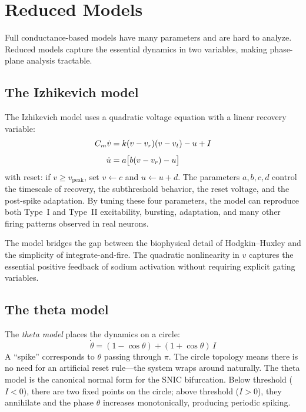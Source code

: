 \section{Reduced Models}
\label{sec:reduced-models}

Full conductance-based models have many parameters and are hard to analyze. Reduced models capture the essential dynamics in two variables, making phase-plane analysis tractable.

\subsection{The Izhikevich model}

The Izhikevich model uses a quadratic voltage equation with a linear recovery variable:
%
\begin{align}
  C_m\dot{v} &= k(v - v_r)(v - v_t) - u + I \label{eq:izh-v} \\[4pt]
  \dot{u} &= a\bigl[b(v - v_r) - u\bigr] \label{eq:izh-u}
\end{align}
%
with reset: if $v \geq v_{\text{peak}}$, set $v \leftarrow c$ and $u \leftarrow u + d$. The parameters $a, b, c, d$ control the timescale of recovery, the subthreshold behavior, the reset voltage, and the post-spike adaptation. By tuning these four parameters, the model can reproduce both Type~I and Type~II excitability, bursting, adaptation, and many other firing patterns observed in real neurons.

The model bridges the gap between the biophysical detail of Hodgkin--Huxley and the simplicity of integrate-and-fire. The quadratic nonlinearity in $v$ captures the essential positive feedback of sodium activation without requiring explicit gating variables.

\subsection{The theta model}

The \emph{theta model} places the dynamics on a circle:
%
\begin{equation}
  \dot{\theta} = (1 - \cos\theta) + (1 + \cos\theta)\,I
  \label{eq:theta}
\end{equation}
%
A ``spike'' corresponds to $\theta$ passing through $\pi$. The circle topology means there is no need for an artificial reset rule---the system wraps around naturally. The theta model is the canonical normal form for the SNIC bifurcation. Below threshold ($I < 0$), there are two fixed points on the circle; above threshold ($I > 0$), they annihilate and the phase $\theta$ increases monotonically, producing periodic spiking.

